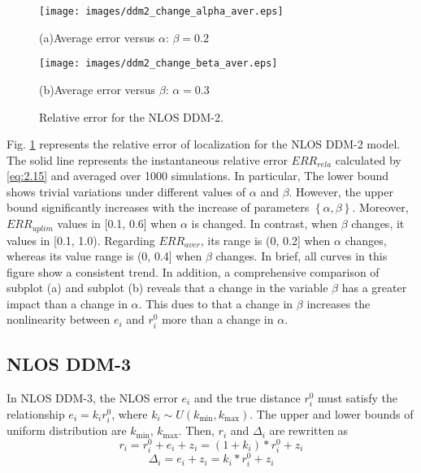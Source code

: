 \documentclass[journal]{IEEEtran}
\begin{document}
\begin{figure}[htb!]
    \centering
    \begin{minipage}{0.3\textwidth}
        \centering
        \texttt{[image: images/ddm2\_change\_alpha\_aver.eps]}
        \caption*{(a)\quad Average error versus $\alpha$: $\beta = 0.2$}
    \end{minipage}
    \vspace{0.5cm} %
    \begin{minipage}{0.3\textwidth}
        \centering
        \texttt{[image: images/ddm2\_change\_beta\_aver.eps]}
        \caption*{(b)\quad Average error versus $\beta$: $\alpha = 0.3$}
    \end{minipage}
    \vspace{-0.5cm}
    \caption{Relative error for the NLOS DDM-2.}
    \label{fig:Fig2}
\end{figure}

Fig. \ref{fig:Fig2} represents the relative error of localization for the NLOS DDM-2 model. The solid line represents the instantaneous relative error ${ERR}_{rela}$ calculated by \eqref{eq:2.15} and averaged over 1000 simulations. In particular, The lower bound shows trivial variations under different values of ${\alpha}$ and ${\beta}$. However, the upper bound significantly increases with the increase of parameters $\left\{{\alpha}, {\beta}\right\}$. Moreover, $ERR_{uplim}$ values in [0.1, 0.6] when ${\alpha}$ is changed. In contrast, when ${\beta}$ changes, it values in [0.1, 1.0). Regarding $ERR_{aver}$, its range is (0, 0.2] when ${\alpha}$ changes, whereas its value range is (0, 0.4] when ${\beta}$ changes. In brief, all curves in this figure show a consistent trend. In addition, a comprehensive comparison of subplot (a) and subplot (b) reveals that a change in the variable ${\beta}$ has a greater impact than a change in ${\alpha}$. This dues to that a change in $\beta$ increases the nonlinearity between ${e_i}$ and ${r_{i}^{0}}$ more than a change in $\alpha$.
\subsection{NLOS DDM-3}

In NLOS DDM-3, the NLOS error $e_i$ and the true distance ${r_{i}^{0}}$ must satisfy the relationship ${{e_i} = {k_i}{r_{i}^{0}}}$, where ${k_i} \sim U({k_{\min}},{k_{\max}})$. The upper and lower bounds of uniform distribution are ${k_{\min}}$, ${k_{\max}}$. Then, $r_i$ and ${\Delta}_i$ are rewritten as
\begin{equation}\label{eq:2.50}
{r_i} = r_i^0 + {e_i} + {z_i} = \left(1+{k_i}\right)*{{r}_{i}^{0}}+{z_i}
 \end{equation}
 \begin{equation}\label{eq:2.51}
{{\Delta}_i} = {e_i} + {z_i} = {k_i}*{{r}_{i}^{0}}+{z_i}
 \end{equation}
\end{document}

